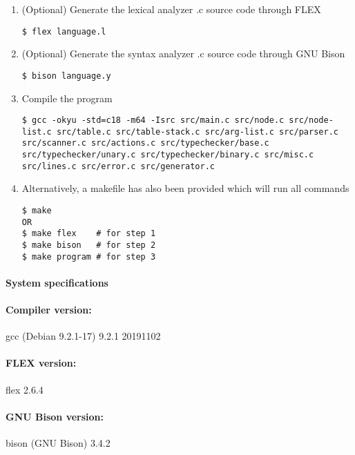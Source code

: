 \begin{enumerate}
\item (Optional) Generate the lexical analyzer .c source code through FLEX
\begin{lstlisting}
$ flex language.l
\end{lstlisting}

\item (Optional) Generate the syntax analyzer .c source code through GNU Bison
\begin{lstlisting}
$ bison language.y
\end{lstlisting}

\item Compile the program
\begin{lstlisting}
$ gcc -okyu -std=c18 -m64 -Isrc src/main.c src/node.c src/node-list.c src/table.c src/table-stack.c src/arg-list.c src/parser.c src/scanner.c src/actions.c src/typechecker/base.c src/typechecker/unary.c src/typechecker/binary.c src/misc.c src/lines.c src/error.c src/generator.c
\end{lstlisting}

\item Alternatively, a makefile has also been provided which will run all commands
\begin{lstlisting}
$ make
OR
$ make flex    # for step 1
$ make bison   # for step 2
$ make program # for step 3
\end{lstlisting}
\end{enumerate}

\paragraph{System specifications}
\paragraph{Compiler version:} gcc (Debian 9.2.1-17) 9.2.1 20191102
\paragraph{FLEX version:} flex 2.6.4
\paragraph{GNU Bison version:} bison (GNU Bison) 3.4.2


